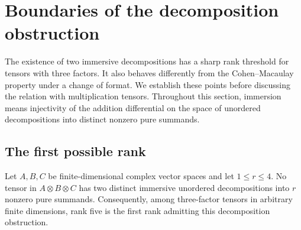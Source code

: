\section{Boundaries of the decomposition obstruction}\label{bound:section}

The existence of two immersive decompositions has a sharp rank threshold
for tensors with three factors. It also behaves differently from the
Cohen--Macaulay property under a change of format. We establish these
points before discussing the relation with multiplication tensors.
Throughout this section, immersion means injectivity of the addition
differential on the space of unordered decompositions into distinct
nonzero pure summands.

\subsection{The first possible rank}\label{bound:threshold-subsection}

\begin{theorem}\label{bound:small-rank}
Let $A,B,C$ be finite-dimensional complex vector spaces and let
$1\leq r\leq4$. No tensor in $A\otimes B\otimes C$ has two distinct
immersive unordered decompositions into $r$ nonzero pure summands.
Consequently, among three-factor tensors in arbitrary finite dimensions,
rank five is the first rank admitting this decomposition obstruction.
\end{theorem}

